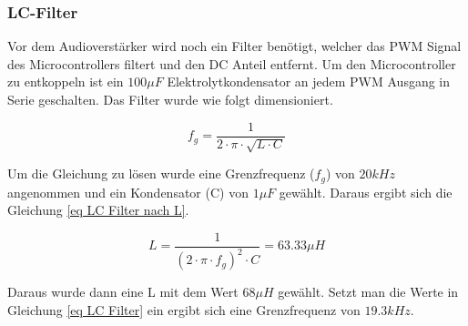 \subsubsection{LC-Filter}
Vor dem Audioverstärker wird noch ein Filter benötigt, welcher das PWM Signal des Microcontrollers filtert und den DC Anteil entfernt. Um den Microcontroller zu entkoppeln ist ein $100\mu F$ Elektrolytkondensator an jedem PWM Ausgang in Serie geschalten. Das Filter wurde wie folgt dimensioniert. 

\begin{equation}
f_g = \frac{1}{2\cdot \pi \cdot \sqrt{L\cdot C}}
\label{eq LC Filter}
\end{equation}

Um die Gleichung zu lösen wurde eine Grenzfrequenz ($f_g$) von $20kHz$ angenommen und ein Kondensator (C) von $1\mu F$ gewählt. Daraus ergibt sich die Gleichung \ref{eq LC Filter nach L}. 


\begin{equation}
L = \frac{1}{(2\cdot \pi \cdot f_g)^2\cdot C } = 63.33\mu H
\label{eq LC Filter nach L}
\end{equation}

Daraus wurde dann eine L mit dem Wert $68\mu H$ gewählt. Setzt man die Werte in Gleichung \ref{eq LC Filter} ein ergibt sich eine Grenzfrequenz von $19.3kHz$. 
